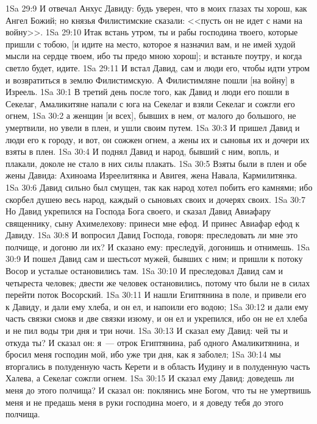 \vs 1Sa 29:9 И отвечал Анхус Давиду: будь уверен, что в моих глазах ты хорош, как Ангел Божий; но князья Филистимские сказали: <<пусть он не идет с нами на войну>>.
\vs 1Sa 29:10 Итак встань утром, ты и рабы господина твоего, которые пришли с тобою, [и идите на место, которое я назначил вам, и не имей худой мысли на сердце твоем, ибо ты предо мною хорош]; и встаньте поутру, и когда светло будет, идите.
\vs 1Sa 29:11 И встал Давид, сам и люди его, чтобы идти утром и возвратиться в землю Филистимскую. А Филистимляне пошли [на войну] в Изреель.
\vs 1Sa 30:1 В третий день после того, как Давид и люди его пошли в Секелаг, Амаликитяне напали с юга на Секелаг и взяли Секелаг и сожгли его огнем,
\vs 1Sa 30:2 а женщин [и всех], бывших в нем, от малого до большого, не умертвили, но увели в плен, и ушли своим путем.
\vs 1Sa 30:3 И пришел Давид и люди его к городу, и вот, он сожжен огнем, а жены их и сыновья их и дочери их взяты в плен.
\vs 1Sa 30:4 И поднял Давид и народ, бывший с ним, вопль, и плакали, доколе не стало в них силы плакать.
\vs 1Sa 30:5 Взяты были в плен и обе жены Давида: Ахиноама Изреелитянка и Авигея,  жена Навала, Кармилитянка.
\vs 1Sa 30:6 Давид сильно был смущен, так как народ хотел побить его камнями; ибо скорбел душею весь народ, каждый о сыновьях своих и дочерях своих.
\vs 1Sa 30:7 Но Давид укрепился  на Господа Бога своего, и сказал Давид Авиафару священнику, сыну Ахимелехову: принеси мне ефод. И принес Авиафар ефод к Давиду.
\vs 1Sa 30:8 И вопросил Давид Господа, говоря: преследовать ли мне это полчище, и догоню ли их? И сказано ему: преследуй, догонишь и отнимешь.
\vs 1Sa 30:9 И пошел Давид сам и шестьсот мужей, бывших с ним; и пришли к потоку Восор и усталые остановились там.
\vs 1Sa 30:10 И преследовал Давид сам и четыреста человек; двести же человек остановились, потому что были не в силах перейти поток Восорский.
\vs 1Sa 30:11 И нашли Египтянина в поле, и привели его к Давиду, и дали ему хлеба, и он ел, и напоили его водою;
\vs 1Sa 30:12 и дали ему часть связки смокв и две связки изюму, и он ел и укрепился, ибо он не ел хлеба и не пил воды три дня и три ночи.
\vs 1Sa 30:13 И сказал ему Давид: чей ты и откуда ты? И сказал он: я~--- отрок Египтянина, раб одного Амаликитянина, и бросил меня господин мой, ибо уже три дня, как я заболел;
\vs 1Sa 30:14 мы вторгались в полуденную часть Керети и в область Иудину и в полуденную часть Халева, а Секелаг сожгли огнем.
\vs 1Sa 30:15 И сказал ему Давид: доведешь ли меня до этого полчища? И сказал он: поклянись мне Богом, что ты не умертвишь меня и не предашь меня в руки господина моего, и я доведу тебя до этого полчища.

